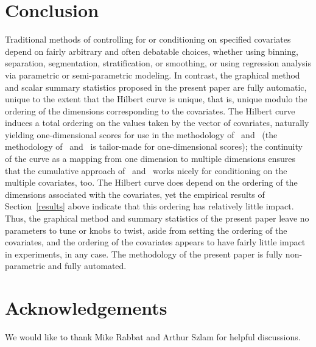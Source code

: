 \documentclass{article}
\begin{document}
\section{Conclusion}
\label{conclusion}

Traditional methods of controlling for or conditioning on specified covariates
depend on fairly arbitrary and often debatable choices,
whether using binning, separation, segmentation, stratification, or smoothing,
or using regression analysis via parametric or semi-parametric modeling.
In contrast, the graphical method and scalar summary statistics
proposed in the present paper are fully automatic,
unique to the extent that the Hilbert curve is unique,
that is, unique modulo the ordering of the dimensions
corresponding to the covariates.
The Hilbert curve induces a total ordering on the values
taken by the vector of covariates, naturally yielding one-dimensional scores
for use in the methodology of~\cite{tygert_full} and~\cite{tygert_two}
(the methodology of~\cite{tygert_full} and~\cite{tygert_two}
is tailor-made for one-dimensional scores);
the continuity of the curve as a mapping from one dimension
to multiple dimensions ensures that the cumulative approach
of~\cite{tygert_full} and~\cite{tygert_two} works nicely
for conditioning on the multiple covariates, too.
The Hilbert curve does depend on the ordering of the dimensions
associated with the covariates, yet the empirical results
of Section~\ref{results} above indicate that this ordering
has relatively little impact.
Thus, the graphical method and summary statistics of the present paper
leave no parameters to tune or knobs to twist,
aside from setting the ordering of the covariates,
and the ordering of the covariates appears to have fairly little impact
in experiments, in any case.
The methodology of the present paper is fully non-parametric
and fully automated.



\section*{Acknowledgements}

We would like to thank Mike Rabbat and Arthur Szlam for helpful discussions.



\newpage





\end{document}
